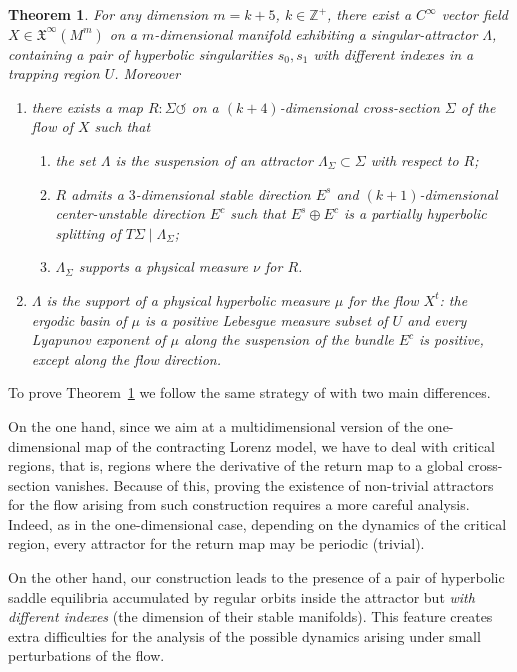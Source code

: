 \documentclass[reqno,12pt,a4paper]{amsart}
\theoremstyle{plain}
\newtheorem{maintheorem}{Theorem}
\theoremstyle{definition}
\begin{document}
\begin{maintheorem}\label{mthm:pri}
  For any dimension $m=k+5$, $k \in{{\mathbb Z}}^+$, there exist a
  $C^{\infty}$ vector field $X \in {{\mathfrak X}}^\infty(M^m)$ on a
  $m$-dimensional manifold exhibiting a singular-attractor
  $\Lambda$, containing a pair of hyperbolic singularities
  $s_0,s_1$ \emph{with different indexes} in a trapping
  region $U$. Moreover
  \begin{enumerate}
  \item there exists a map
    $R:\Sigma\circlearrowleft$ on a $(k+4)$-dimensional
    cross-section $\Sigma$ of the flow of $X$ such that
    \begin{enumerate}
    \item the set $\Lambda$ is the suspension of an attractor
      $\Lambda_\Sigma\subset\Sigma$ with respect to $R$;
    \item $R$ admits a $3$-dimensional stable direction $E^s$
      and $(k+1)$-dimensional center-unstable direction $E^c$
      such that $E^s\oplus E^c$ is a partially hyperbolic
      splitting of $T\Sigma\mid\Lambda_\Sigma$;
    \item $\Lambda_\Sigma$ supports a physical measure $\nu$
      for $R$.
    \end{enumerate}
  \item $\Lambda$ is the
    support of a physical hyperbolic measure $\mu$ for the
    flow $X^t$: the ergodic basin of $\mu$ is a positive
    Lebesgue measure subset of $U$ and every Lyapunov
    exponent of $\mu$ along the suspension of the bundle
    $E^c$ is positive, except along the flow direction.
  \end{enumerate}
\end{maintheorem}

To prove Theorem~\ref{mthm:pri} we follow the same strategy
of \cite{BPV97} with two main differences.

On the one hand, since we aim at a multidimensional version
of the one-dimensional map of the contracting Lorenz model,
we have to deal with critical regions, that is, regions
where the derivative of the return map to a global
cross-section vanishes.  Because of this, proving the
existence of non-trivial attractors for the flow arising
from such construction requires a more careful analysis.
Indeed, as in the one-dimensional case, depending on the
dynamics of the critical region, every attractor for the
return map may be periodic (trivial).

On the other hand, our construction leads to the presence of
a pair of hyperbolic saddle equilibria accumulated by
regular orbits inside the attractor but \emph{with different
  indexes} (the dimension of their stable manifolds). This
feature creates extra difficulties for the analysis of the
possible dynamics arising under small perturbations of the
flow.
\end{document}
